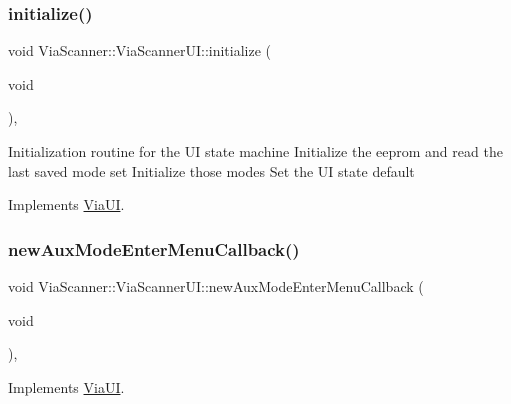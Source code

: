 \mbox{\label{class_via_scanner_1_1_via_scanner_u_i_ab12af2665a9e58574cd0cb4b8a003e0b}} 
\subsubsection{\texorpdfstring{initialize()}{initialize()}}
{\footnotesize\ttfamily void Via\+Scanner\+::\+Via\+Scanner\+U\+I\+::initialize (\begin{DoxyParamCaption}\item[{void}]{ }\end{DoxyParamCaption})\hspace{0.3cm}{\ttfamily [override]}, {\ttfamily [virtual]}}

Initialization routine for the UI state machine Initialize the eeprom and read the last saved mode set Initialize those modes Set the UI state default 

Implements \mbox{\hyperlink{class_via_u_i_a573ba7aef8f4982ec4900258c770bdbb}{Via\+UI}}.

\mbox{\label{class_via_scanner_1_1_via_scanner_u_i_a8176484cc1deb6df08abfe1f0c1f789f}} 
\subsubsection{\texorpdfstring{new\+Aux\+Mode\+Enter\+Menu\+Callback()}{newAuxModeEnterMenuCallback()}}
{\footnotesize\ttfamily void Via\+Scanner\+::\+Via\+Scanner\+U\+I\+::new\+Aux\+Mode\+Enter\+Menu\+Callback (\begin{DoxyParamCaption}\item[{void}]{ }\end{DoxyParamCaption})\hspace{0.3cm}{\ttfamily [override]}, {\ttfamily [virtual]}}



Implements \mbox{\hyperlink{class_via_u_i_a6fdbe125cd3652807631631edc636d39}{Via\+UI}}.

